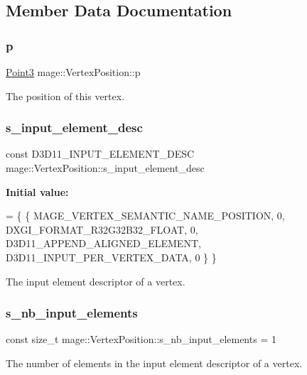 \subsection{Member Data Documentation}
\hypertarget{structmage_1_1_vertex_position_ad9c3ea68e2c1745446387d1eca28f25f}{}\label{structmage_1_1_vertex_position_ad9c3ea68e2c1745446387d1eca28f25f} 
\subsubsection{\texorpdfstring{p}{p}}
{\footnotesize\ttfamily \hyperlink{structmage_1_1_point3}{Point3} mage\+::\+Vertex\+Position\+::p}

The position of this vertex. \hypertarget{structmage_1_1_vertex_position_a4e43cd06303beccd4791fdec9a13c47f}{}\label{structmage_1_1_vertex_position_a4e43cd06303beccd4791fdec9a13c47f} 
\subsubsection{\texorpdfstring{s\+\_\+input\+\_\+element\+\_\+desc}{s\_input\_element\_desc}}
{\footnotesize\ttfamily const D3\+D11\+\_\+\+I\+N\+P\+U\+T\+\_\+\+E\+L\+E\+M\+E\+N\+T\+\_\+\+D\+E\+SC mage\+::\+Vertex\+Position\+::s\+\_\+input\+\_\+element\+\_\+desc\hspace{0.3cm}{\ttfamily [static]}}

{\bfseries Initial value\+:}
\begin{DoxyCode}
= \{
        \{ MAGE\_VERTEX\_SEMANTIC\_NAME\_POSITION, 0, DXGI\_FORMAT\_R32G32B32\_FLOAT,    0, 
      D3D11\_APPEND\_ALIGNED\_ELEMENT, D3D11\_INPUT\_PER\_VERTEX\_DATA, 0 \}
    \}
\end{DoxyCode}
The input element descriptor of a vertex. \hypertarget{structmage_1_1_vertex_position_aa4a7ef6da8f6bafd32ab180786ee93a0}{}\label{structmage_1_1_vertex_position_aa4a7ef6da8f6bafd32ab180786ee93a0} 
\subsubsection{\texorpdfstring{s\+\_\+nb\+\_\+input\+\_\+elements}{s\_nb\_input\_elements}}
{\footnotesize\ttfamily const size\+\_\+t mage\+::\+Vertex\+Position\+::s\+\_\+nb\+\_\+input\+\_\+elements = 1\hspace{0.3cm}{\ttfamily [static]}}

The number of elements in the input element descriptor of a vertex. 